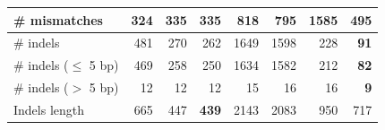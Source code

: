 \documentclass[12pt,a4paper]{article}
\begin{document}
\begin{table}[ht]
\begin{center}
\begin{tabular}{|l*{7}{|r}|}
\# mismatches & {\bf 324} & 335 & 335 & 818 & 795 & 1585 & 495 \\ \hline
\# indels & 481 & 270 & 262 & 1649 & 1598 & 228 & {\bf 91} \\ \hline
\hspace{5mm}\# indels ($\leq$ 5 bp) & 469 & 258 & 250 & 1634 & 1582 & 212 & {\bf 82} \\ \hline
\hspace{5mm}\# indels ($>$ 5 bp) & 12 & 12 & 12 & 15 & 16 & 16 & {\bf 9} \\ \hline
Indels length & 665 & 447 & {\bf 439} & 2143 & 2083 & 950 & 717 \\ \hline
\end{tabular}
\end{center}
\end{table}
\end{document}
